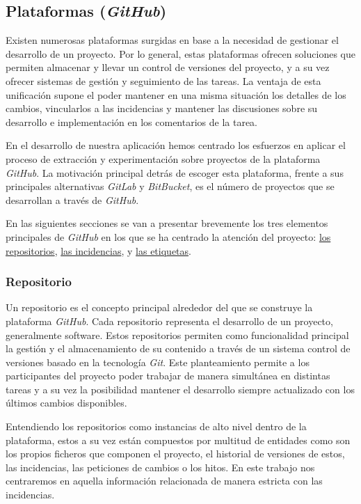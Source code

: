 \subsection{Plataformas (\emph{GitHub})} \label{sec:plataformas}

Existen numerosas plataformas surgidas en base a la necesidad de gestionar el desarrollo de un proyecto. Por lo general, estas plataformas ofrecen soluciones que permiten almacenar y llevar un control de versiones del proyecto, y a su vez ofrecer sistemas de gestión y seguimiento de las tareas. La ventaja de esta unificación supone el poder mantener en una misma situación los detalles de los cambios, vincularlos a las incidencias y mantener las discusiones sobre su desarrollo e implementación en los comentarios de la tarea.

En el desarrollo de nuestra aplicación hemos centrado los esfuerzos en aplicar el proceso de extracción y experimentación sobre proyectos de la plataforma \emph{GitHub}. La motivación principal detrás de escoger esta plataforma, frente a sus principales alternativas \emph{GitLab} y \emph{BitBucket}, es el número de proyectos que se desarrollan a través de \emph{GitHub}.

En las siguientes secciones se van a presentar brevemente los tres elementos principales de \emph{GitHub} en los que se ha centrado la atención del proyecto: \hyperref[sec:repositorio]{los repositorios}, \hyperref[sec:incidencia]{las incidencias}, y \hyperref[sec:etiqueta]{las etiquetas}.

\subsubsection{Repositorio} \label{sec:repositorio}

Un repositorio \cite{ct:github_repository} es el concepto principal alrededor del que se construye la plataforma \emph{GitHub}. Cada repositorio representa el desarrollo de un proyecto, generalmente software. Estos repositorios permiten como funcionalidad principal la gestión y el almacenamiento de su contenido a través de un sistema control de versiones basado en la tecnología \emph{Git}. Este planteamiento permite a los participantes del proyecto poder trabajar de manera simultánea en distintas tareas y a su vez la posibilidad mantener el desarrollo siempre actualizado con los últimos cambios disponibles.

Entendiendo los repositorios como instancias de alto nivel dentro de la plataforma, estos a su vez están compuestos por multitud de entidades como son los propios ficheros que componen el proyecto, el historial de versiones de estos, las incidencias, las peticiones de cambios o los hitos. En este trabajo nos centraremos en aquella información relacionada de manera estricta con las incidencias.

